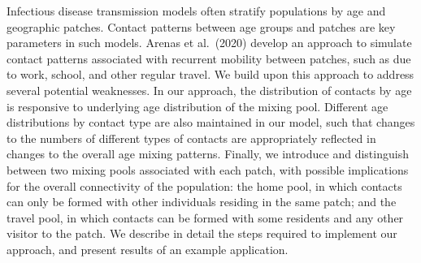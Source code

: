 Infectious disease transmission models often stratify populations by age and geographic patches.
Contact patterns between age groups and patches are key parameters in such models.
Arenas et al.\ (2020) develop an approach to simulate contact patterns associated with
recurrent mobility between patches, such as due to work, school, and other regular travel.
We build upon this approach to address several potential weaknesses.
In our approach, the distribution of contacts by age
is responsive to underlying age distribution of the mixing pool.
Different age distributions by contact type are also maintained in our model,
such that changes to the numbers of different types of contacts
are appropriately reflected in changes to the overall age mixing patterns.
Finally, we introduce and distinguish between two mixing pools associated with each patch,
with possible implications for the overall connectivity of the population:
the home pool, in which contacts can only be formed with other individuals residing in the same patch;
and the travel pool, in which contacts can be formed with some residents and any other visitor to the patch.
We describe in detail the steps required to implement our approach,
and present results of an example application.
